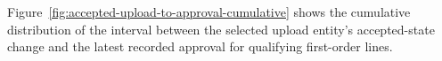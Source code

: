 \label{subsec:approval-analysis}
Figure~\ref{fig:accepted-upload-to-approval-cumulative} shows the cumulative
distribution of the interval between the selected upload entity's accepted-state
change and the latest recorded approval for qualifying first-order lines.


\clearpage
\linenumbers



\clearpage
\nolinenumbers
